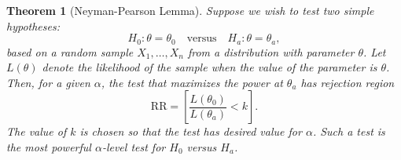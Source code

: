 \documentclass[10pt]{article}
\newtheorem{theorem}{Theorem}
\theoremstyle{definition}
\newcommand{\1}[1]{\textbf{1}_{\left[#1\right]}} %
\begin{document}
\begin{theorem}[Neyman-Pearson Lemma]
  \label{thm:neyman-pearson-lemma}
  Suppose we wish to test two simple hypotheses:
  \begin{equation*}
    H_{0}:\theta=\theta_{0} \quad \text{versus} \quad H_{a}: \theta=\theta_{a},
  \end{equation*}
  based on a random sample $X_{1},\ldots,X_{n}$ from a distribution with
  parameter $\theta$. Let $L(\theta)$ denote the likelihood of the sample when
  the value of the parameter is $\theta$. Then, for a given $\alpha$, the test
  that maximizes the power at $\theta_{a}$ has rejection region
  \begin{equation*}
    \text{RR} = \left[ \frac{L(\theta_{0})}{L(\theta_{a})}<k \right]. 
  \end{equation*}
  The value of $k$ is chosen so that the test has desired value for $\alpha$.
  Such a test is the most powerful $\alpha$-level test for $H_{0}$ versus $H_{a}$.
\end{theorem}
\end{document}
